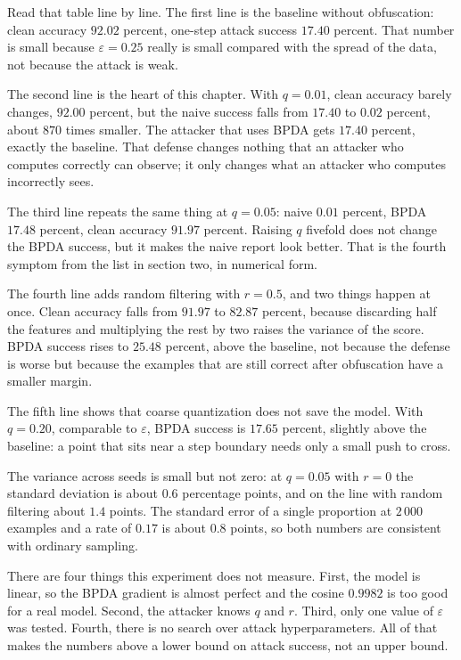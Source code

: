 Read that table line by line. The first line is the baseline without obfuscation:
clean accuracy $92.02$ percent, one-step attack success $17.40$ percent.
That number is small because $\varepsilon=0.25$ really is small compared with the spread of the
data, not because the attack is weak.

The second line is the heart of this chapter. With $q=0.01$, clean accuracy barely changes,
$92.00$ percent, but the naive success falls from $17.40$ to $0.02$ percent,
about $870$ times smaller. The attacker that uses BPDA gets $17.40$ percent,
exactly the baseline. That defense changes nothing that an attacker who computes correctly can
observe; it only changes what an attacker who computes incorrectly sees.

The third line repeats the same thing at $q=0.05$: naive $0.01$ percent, BPDA
$17.48$ percent, clean accuracy $91.97$ percent. Raising $q$ fivefold does not
change the BPDA success, but it makes the naive report look better. That is the
fourth symptom from the list in section two, in numerical form.

The fourth line adds random filtering with $r=0.5$, and two things happen at once.
Clean accuracy falls from $91.97$ to $82.87$ percent, because discarding half the features and
multiplying the rest by two raises the variance of the score. BPDA success rises to $25.48$
percent, above the baseline, not because the defense is worse but because the examples
that are still correct after obfuscation have a smaller margin.

The fifth line shows that coarse quantization does not save the model. With
$q=0.20$, comparable to $\varepsilon$, BPDA success is $17.65$ percent, slightly
above the baseline: a point that sits near a step boundary needs only a small push to
cross.

The variance across seeds is small but not zero: at $q=0.05$ with $r=0$ the standard deviation is
about $0.6$ percentage points, and on the line with random filtering about $1.4$ points. The standard
error of a single proportion at $2\,000$ examples and a rate of $0.17$ is about $0.8$ points, so
both numbers are consistent with ordinary sampling.

There are four things this experiment does not measure. First, the model is linear, so the BPDA
gradient is almost perfect and the cosine $0.9982$ is too good for a real model. Second, the
attacker knows $q$ and $r$. Third, only one value of $\varepsilon$ was tested.
Fourth, there is no search over attack hyperparameters. All of that makes the numbers above
a lower bound on attack success, not an upper bound.


